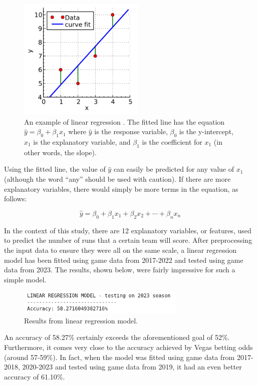 \documentclass{paper}
\begin{document}
\begin{figure}[H]
  \centering
  \includegraphics[width=6cm]{fig12}
  \caption{An example of linear regression \cite{linreg}. The fitted line has the equation $\hat{y}=\beta_0+\beta_1x_1$ where $\hat{y}$ is the response variable, $\beta_0$ is the y-intercept, $x_1$ is the explanatory variable, and $\beta_1$ is the coefficient for $x_1$ (in other words, the slope).}
\end{figure}

Using the fitted line, the value of $\hat{y}$ can easily be predicted for any value of $x_1$ (although the word ``any'' should be used with caution). If there are more explanatory variables, there would simply be more terms in the equation, as follows:

$$\hat{y}=\beta_0+\beta_1x_1+\beta_2x_2+\cdots+\beta_nx_n$$

In the context of this study, there are 12 explanatory variables, or features, used to predict the number of runs that a certain team will score. After preprocessing the input data to ensure they were all on the same scale, a linear regression model has been fitted using game data from 2017-2022 and tested using game data from 2023. The results, shown below, were fairly impressive for such a simple model.

\begin{figure}[H]
  \centering
  \includegraphics[width=8cm]{fig2}
  \caption{Results from linear regression model.}
\end{figure}

An accuracy of 58.27\% certainly exceeds the aforementioned goal of 52\%. Furthermore, it comes very close to the accuracy achieved by Vegas betting odds (around 57-59\%). In fact, when the model was fitted using game data from 2017-2018, 2020-2023 and tested using game data from 2019, it had an even better accuracy of 61.10\%.
\end{document}
